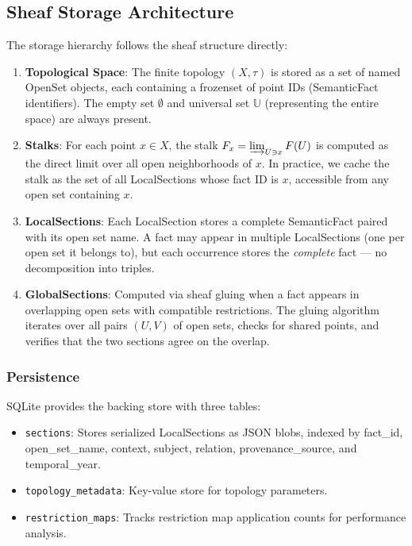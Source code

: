 
\subsection{Sheaf Storage Architecture}

The storage hierarchy follows the sheaf structure directly:

\begin{enumerate}
    \item \textbf{Topological Space}: The finite topology $(X, \tau)$ is stored as a set of named OpenSet objects, each containing a frozenset of point IDs (SemanticFact identifiers). The empty set $\emptyset$ and universal set $\mathbb{U}$ (representing the entire space) are always present.

    \item \textbf{Stalks}: For each point $x \in X$, the stalk $F_x = \varinjlim_{U \ni x} F(U)$ is computed as the direct limit over all open neighborhoods of $x$. In practice, we cache the stalk as the set of all LocalSections whose fact ID is $x$, accessible from any open set containing $x$.

    \item \textbf{LocalSections}: Each LocalSection stores a complete SemanticFact paired with its open set name. A fact may appear in multiple LocalSections (one per open set it belongs to), but each occurrence stores the \emph{complete} fact — no decomposition into triples.

    \item \textbf{GlobalSections}: Computed via sheaf gluing when a fact appears in overlapping open sets with compatible restrictions. The gluing algorithm iterates over all pairs $(U, V)$ of open sets, checks for shared points, and verifies that the two sections agree on the overlap.
\end{enumerate}

\subsubsection{Persistence}

SQLite provides the backing store with three tables:

\begin{itemize}
    \item \texttt{sections}: Stores serialized LocalSections as JSON blobs, indexed by fact\_id, open\_set\_name, context, subject, relation, provenance\_source, and temporal\_year.
    \item \texttt{topology\_metadata}: Key-value store for topology parameters.
    \item \texttt{restriction\_maps}: Tracks restriction map application counts for performance analysis.
\end{itemize}


